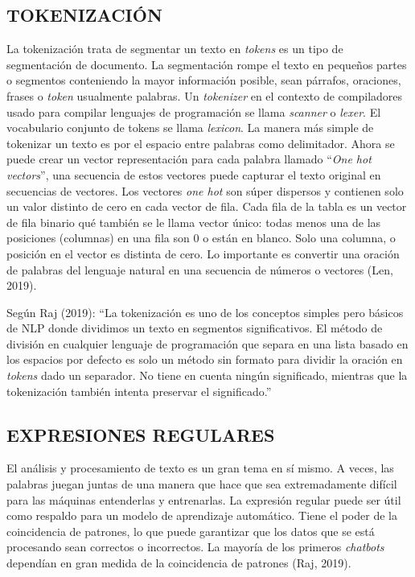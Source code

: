 \documentclass[letter, openright, 12pt]{book}
\begin{document}
\subsection{TOKENIZACIÓN}
La tokenización trata de segmentar un texto en \textit{tokens} es un tipo de segmentación de documento. La segmentación rompe el texto en pequeños partes o segmentos conteniendo la mayor información posible, sean párrafos, oraciones, frases o \textit{token} usualmente palabras. Un \textit{tokenizer} en el contexto de compiladores usado para compilar lenguajes de programación se llama \textit{scanner} o \textit{lexer}. El vocabulario conjunto de tokens se llama \textit{lexicon}. La manera más simple de tokenizar un texto es por el espacio entre palabras como delimitador. Ahora se puede crear un vector representación para cada palabra llamado “\textit{One hot vectors}”, una secuencia de estos vectores puede capturar el texto original en secuencias de vectores. Los vectores \textit{one hot} son súper dispersos y contienen solo un valor distinto de cero en cada vector de fila. Cada fila de la tabla es un vector de fila binario qué también se le llama vector único: todas menos una de las posiciones (columnas) en una fila son 0 o están en blanco. Solo una columna, o posición en el vector es distinta de cero. Lo importante es convertir una oración de palabras del lenguaje natural en una secuencia de números o vectores (Len, 2019).
\par 
Según Raj (2019): “La tokenización es uno de los conceptos simples pero básicos de NLP donde dividimos un texto en segmentos significativos. El método de división en cualquier lenguaje de programación que separa en una lista basado en los espacios por defecto es solo un método sin formato para dividir la oración en \textit{tokens} dado un separador. No tiene en cuenta ningún significado, mientras que la tokenización también intenta preservar el significado.”

\subsection{EXPRESIONES REGULARES}
El análisis y procesamiento de texto es un gran tema en sí mismo. A veces, las palabras juegan juntas de una manera que hace que sea extremadamente difícil para las máquinas entenderlas y entrenarlas. La expresión regular puede ser útil como respaldo para un modelo de aprendizaje automático. Tiene el poder de la coincidencia de patrones, lo que puede garantizar que los datos que se está procesando sean correctos o incorrectos. La mayoría de los primeros \textit{chatbots} dependían en gran medida de la coincidencia de patrones (Raj, 2019).
\end{document}
